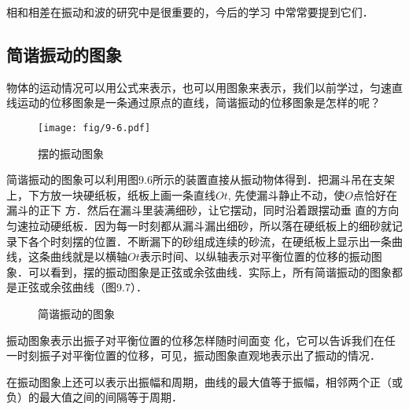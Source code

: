 相和相差在振动和波的研究中是很重要的，今后的学习
中常常要提到它们．

\subsection{简谐振动的图象}
物体的运动情况可以用公式来表示，也可以用图象来表示，我们以前学过，匀速直线运动的位移图象是一条通过原点的直线，简谐振动的位移图象是怎样的呢？
\begin{figure}[htp]\centering
    \texttt{[image: fig/9-6.pdf]}
    \caption{摆的振动图象}
    \end{figure}

简谐振动的图象可以利用图9.6所示的装置直接从振动物体得到．把漏斗吊在支架上，下方放一块硬纸板，纸板上画一条直线$Ot$, 先使漏斗静止不动，使$O$点恰好在漏斗的正下
方．然后在漏斗里装满细砂，让它摆动，同时沿着跟摆动垂
直的方向匀速拉动硬纸板．因为每一时刻都从漏斗漏出细砂，所以落在硬纸板上的细砂就记录下各个时刻摆的位置．不断漏下的砂组成连续的砂流，在硬纸板上显示出一条曲线，这条曲线就是以横轴$Ot$表示时间、以纵轴表示对平衡位置的位移的振动图象．可以看到，摆的振动图象是正弦或余弦曲线．实际上，所有简谐振动的图象都是正弦或余弦曲线（图9.7）．
\begin{figure}\centering
    \caption{简谐振动的图象}
\end{figure}

振动图象表示出振子对平衡位置的位移怎样随时间面变
化，它可以告诉我们在任一时刻振子对平衡位置的位移，可见，振动图象直观地表示出了振动的情况．

在振动图象上还可以表示出振幅和周期，曲线的最大值等于振幅，相邻两个正（或负）的最大值之间的间隔等于周期．

